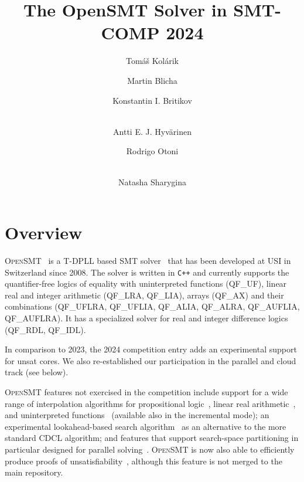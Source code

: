 \documentclass{easychair}
\title{The OpenSMT Solver in SMT-COMP 2024}
\author{
Tomáš Kolárik\inst{1} \and
Martin Blicha\inst{1,3} \and
Konstantin I. Britikov\inst{1} \and
\\
Antti E. J. Hyv{\"a}rinen\inst{2} \and
Rodrigo Otoni\inst{1} \and
\\
Natasha Sharygina\inst{1} \\
}
\institute{Universit{\`a} della Svizzera italiana (USI), Lugano,
Switzerland \and Certora \and Ethereum Foundation}
\date{}
\newcommand{\qflra}{QF\_LRA}
\newcommand{\qflia}{QF\_LIA}
\newcommand{\qfuf}{QF\_UF}
\newcommand{\qfbv}{QF\_BV}
\newcommand{\qfrdl}{QF\_RDL}
\newcommand{\qfidl}{QF\_IDL}
\newcommand{\qfuflra}{QF\_UFLRA}
\newcommand{\qfuflia}{QF\_UFLIA}
\newcommand{\qfax}{QF\_AX}
\newcommand{\qfauflia}{QF\_AUFLIA}
\newcommand{\qfauflra}{QF\_AUFLRA}
\newcommand{\qfalia}{QF\_ALIA}
\newcommand{\qfalra}{QF\_ALRA}
\newcommand{\opensmt}{\textsc{OpenSMT}\xspace}
\begin{document}
\maketitle

\section{Overview}

\opensmt~\cite{HyvarinenMAS16} is a T-DPLL based SMT
solver~\cite{NieuwenhuisOT:JACM06}
that has been developed at USI in Switzerland since 2008.
The solver is written in \texttt{C++} and
currently supports the quantifier-free logics of equality with
uninterpreted functions (\qfuf), linear real and integer arithmetic
(\qflra, \qflia), arrays (\qfax) and their combinations (\qfuflra, \qfuflia, \qfalia, \qfalra, \qfauflia, \qfauflra).
It has a specialized solver for real and integer difference logics (\qfrdl,
\qfidl).

In comparison to 2023, the 2024 competition entry adds
an experimental support for unsat cores.
We also re-established our participation in the parallel and cloud track
(see below).

\opensmt features not exercised in the competition include support for a
wide range of interpolation algorithms for propositional
logic~\cite{AltFHS:VSTTE2015}, linear real
arithmetic~\cite{BlichaHKS19}, and uninterpreted
functions~\cite{AltHAS:FMCAD17} (available also in the incremental
mode); an experimental look\-ahead-based search
algorithm~\cite{HyvarinenMSCS18} as an alternative to the more standard
CDCL algorithm; and features that support search-space partitioning in
particular designed for parallel solving~\cite{HyvarinenMS:SAT15}.
\opensmt is now also able to efficiently produce proofs of
unsatisfiability~\cite{OtoniBEHS:DAC21}, although this feature is not merged to the main repository.
\end{document}
